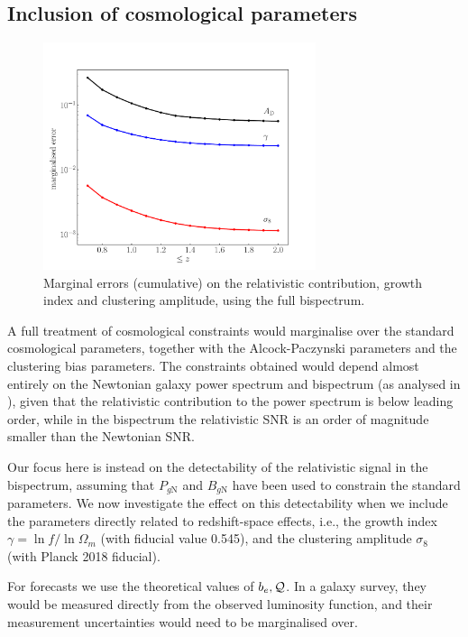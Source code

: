 \subsection{Inclusion of cosmological parameters}
\begin{figure}[ht]
\centering
\includegraphics[width=8.0cm]{fig/gamma_sigma8_AD-eps-converted-to}
\caption{Marginal errors (cumulative) on the relativistic contribution, growth index and clustering amplitude, using the full bispectrum.} \label{sig}
\end{figure}
{A full treatment of cosmological constraints would marginalise over the standard cosmological parameters, together with the Alcock-Paczynski parameters and the clustering bias parameters. The constraints obtained would depend almost entirely on the Newtonian galaxy power spectrum and bispectrum (as analysed in \cite{Yankelevich:2018uaz}), given that the relativistic contribution to the power spectrum is below leading order, while in the bispectrum the relativistic SNR is  an order of magnitude smaller than the Newtonian SNR. 

Our focus here is instead on the detectability of the relativistic signal in the bispectrum, {assuming that $P_{g\mathrm{N}}$ and $B_{g\mathrm{N}}$ have been used to constrain the standard parameters.}
We now investigate the effect on this detectability when we include the parameters directly related to redshift-space effects, i.e.,  the growth index $\gamma=\ln f/ \ln\Omega_m$ (with fiducial value 0.545), and the clustering amplitude $\sigma_8$ (with Planck 2018 fiducial).} 
{For forecasts we use the theoretical values of $b_e, \mathcal{Q}$. In a galaxy survey, they would be measured directly from the observed luminosity function, and their measurement uncertainties would need to be marginalised over.}


